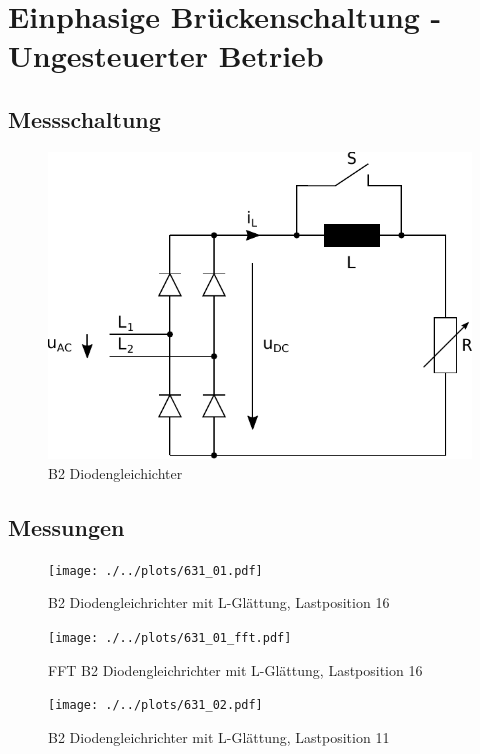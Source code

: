 \section{Einphasige Brückenschaltung - Ungesteuerter Betrieb}

\subsection{Messschaltung}

\begin{figure}[h!]
    \centering
    \includegraphics[scale=\sscale]{./../fig/b2_diode.pdf}
    \caption{B2 Diodengleichichter}
\end{figure}

\subsection{Messungen}

\begin{figure}[h!]
    \centering
    \texttt{[image: ./../plots/631\_01.pdf]}
    \caption{B2 Diodengleichrichter mit L-Glättung, Lastposition 16}
\end{figure}

\begin{figure}[h!]
    \centering
    \texttt{[image: ./../plots/631\_01\_fft.pdf]}
    \caption{FFT B2 Diodengleichrichter mit L-Glättung, Lastposition 16}
\end{figure}


\begin{figure}[h!]
    \centering
    \texttt{[image: ./../plots/631\_02.pdf]}
    \caption{B2 Diodengleichrichter mit L-Glättung, Lastposition 11}
\end{figure}

